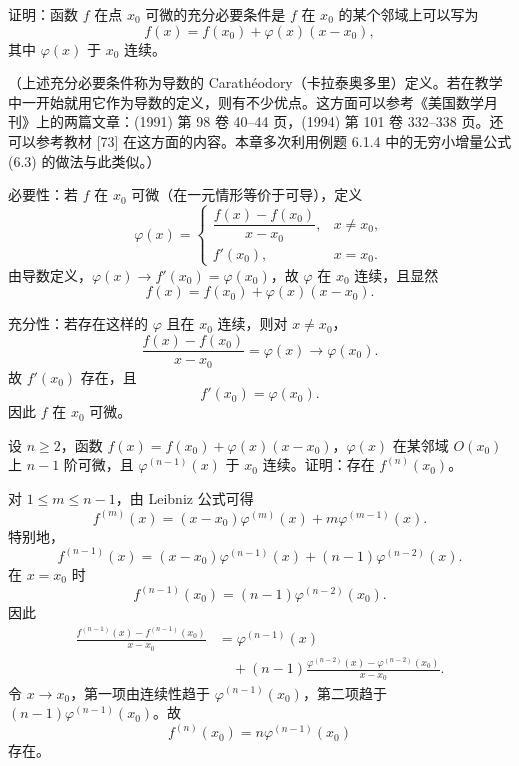 \begin{xreferenceproblem}[14]
证明：函数 $f$ 在点 $x_0$ 可微的充分必要条件是 $f$ 在 $x_0$ 的某个邻域上可以写为
  \[
    f(x)=f(x_0)+\varphi(x)(x-x_0),
  \]
  其中 $\varphi(x)$ 于 $x_0$ 连续。

  （上述充分必要条件称为导数的 Carathéodory（卡拉泰奥多里）定义。若在教学中一开始就用它作为导数的定义，则有不少优点。这方面可以参考《美国数学月刊》上的两篇文章：(1991) 第 98 卷 40--44 页，(1994) 第 101 卷 332--338 页。还可以参考教材 [73] 在这方面的内容。本章多次利用例题 6.1.4 中的无穷小增量公式 (6.3) 的做法与此类似。）
\end{xreferenceproblem}
\begin{xsolution}
必要性：若 $f$ 在 $x_0$ 可微（在一元情形等价于可导），定义
\[
  \varphi(x)=
  \begin{cases}
    \dfrac{f(x)-f(x_0)}{x-x_0},&x\ne x_0,\\[6pt]
    f'(x_0),&x=x_0.
  \end{cases}
\]
由导数定义，$\varphi(x)\to f'(x_0)=\varphi(x_0)$，故 $\varphi$ 在 $x_0$ 连续，且显然
\[
  f(x)=f(x_0)+\varphi(x)(x-x_0).
\]

充分性：若存在这样的 $\varphi$ 且在 $x_0$ 连续，则对 $x\ne x_0$，
\[
  \frac{f(x)-f(x_0)}{x-x_0}=\varphi(x)\to\varphi(x_0).
\]
故 $f'(x_0)$ 存在，且
\[
  f'(x_0)=\varphi(x_0).
\]
因此 $f$ 在 $x_0$ 可微。
\end{xsolution}


\begin{xreferenceproblem}[15]
设 $n\ge2$，函数 $f(x)=f(x_0)+\varphi(x)(x-x_0)$，$\varphi(x)$ 在某邻域 $O(x_0)$ 上 $n-1$ 阶可微，且 $\varphi^{(n-1)}(x)$ 于 $x_0$ 连续。证明：存在 $f^{(n)}(x_0)$。
\end{xreferenceproblem}
\begin{xsolution}
对 $1\le m\le n-1$，由 Leibniz 公式可得
\[
  f^{(m)}(x)=(x-x_0)\varphi^{(m)}(x)+m\varphi^{(m-1)}(x).
\]
特别地，
\[
  f^{(n-1)}(x)
  =(x-x_0)\varphi^{(n-1)}(x)+(n-1)\varphi^{(n-2)}(x).
\]
在 $x=x_0$ 时
\[
  f^{(n-1)}(x_0)=(n-1)\varphi^{(n-2)}(x_0).
\]
因此
\begin{align*}
  \frac{f^{(n-1)}(x)-f^{(n-1)}(x_0)}{x-x_0}
  &=\varphi^{(n-1)}(x)\\
  &\quad +(n-1)\frac{\varphi^{(n-2)}(x)-\varphi^{(n-2)}(x_0)}{x-x_0}.
\end{align*}
令 $x\to x_0$，第一项由连续性趋于 $\varphi^{(n-1)}(x_0)$，第二项趋于 $(n-1)\varphi^{(n-1)}(x_0)$。故
\[
  \boxed{f^{(n)}(x_0)=n\varphi^{(n-1)}(x_0)}
\]
存在。
\end{xsolution}


